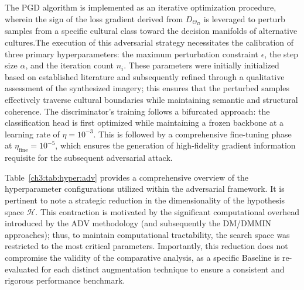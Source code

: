 The PGD algorithm is implemented as an iterative optimization procedure, wherein the sign of the loss gradient derived from $D_{\Theta_D}$ is leveraged to perturb samples from a specific cultural class toward the decision manifolds of alternative cultures.The execution of this adversarial strategy necessitates the calibration of three primary hyperparameters: the maximum perturbation constraint $\epsilon$, the step size $\alpha$, and the iteration count $n_i$. 
These parameters were initially initialized based on established literature and subsequently refined through a qualitative assessment of the synthesized imagery; this ensures that the perturbed samples effectively traverse cultural boundaries while maintaining semantic and structural coherence.
The discriminator's training follows a bifurcated approach: the classification head is first optimized while maintaining a frozen backbone at a learning rate of $\eta = 10^{-3}$. 
This is followed by a comprehensive fine-tuning phase at $\eta_{\text{fine}} = 10^{-5}$, which ensures the generation of high-fidelity gradient information requisite for the subsequent adversarial attack.

Table~\ref{ch3:tab:hyper:adv} provides a comprehensive overview of the hyperparameter configurations utilized within the adversarial framework. 
It is pertinent to note a strategic reduction in the dimensionality of the hypothesis space $\mathcal{H}$. 
This contraction is motivated by the significant computational overhead introduced by the ADV methodology (and subsequently the DM/DMMIN approaches); thus, to maintain computational tractability, the search space was restricted to the most critical parameters. 
Importantly, this reduction does not compromise the validity of the comparative analysis, as a specific Baseline is re-evaluated for each distinct augmentation technique to ensure a consistent and rigorous performance benchmark.

